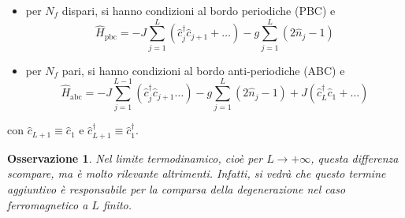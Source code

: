 \documentclass[11pt, a4paper]{scrartcl}
\theoremstyle{style}
\newtheorem{osservazione}{Osservazione}[section]
\theoremstyle{style1}
\numberwithin{equation}{subsection}
\begin{document}
\begin{itemize}
	\item per $N_f$ dispari, si hanno condizioni al bordo periodiche (PBC) e 
		\[
		\hat{H}_\text{pbc} = - J \sum_{j=1}^{L} \left(\hat{c}_j^\dagger \hat{c}_{j+1} + \ldots\right)  - g \sum_{j=1}^{L} \left(2\hat{n}_j - 1\right)
		\] 
	\item per $N_f$ pari, si hanno condizioni al bordo anti-periodiche (ABC) e 	
		\[
		\hat{H}_\text{abc} = - J \sum_{j=1}^{L-1} \left(\hat{c}^\dagger _{j} \hat{c}_{j+1} \ldots\right) - g \sum_{j=1}^{L} (2\hat{n}_j - 1) + J\left(\hat{c}^\dagger _L \hat{c}_1 +\ldots\right) 
		\] 
\end{itemize}
con $\hat{c}_{L+1} \equiv \hat{c}_1$ e $\hat{c}_{L+1} ^\dagger \equiv \hat{c}^\dagger _1$.
\begin{osservazione}
Nel limite termodinamico, cio\`e per $L\to +\infty$, questa differenza scompare, ma \`e molto rilevante altrimenti.
Infatti, si vedr\`a che questo termine aggiuntivo \`e responsabile per la comparsa della degenerazione nel caso ferromagnetico a $L$ finito.
\end{osservazione}
\end{document}
